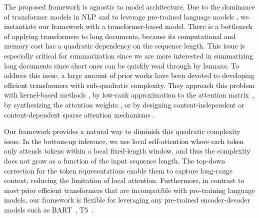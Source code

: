 \documentclass{article} \usepackage{iclr2022_conference,times}
\begin{document}
The proposed framework is agnostic to model architecture. Due to the dominance of transformer models in NLP \citep{chen-etal-2018-best, zhang2020pegasus, sun-etal-2019-utilizing, martin-etal-2020-camembert} and to leverage pre-trained language models \citep{Liu2019RoBERTaAR, lewis-etal-2020-bart}, we instantiate our framework with a transformer-based model. There is a bottleneck of applying transformers to long documents, because its computational and memory cost has a quadratic dependency on the sequence length. This issue is especially critical for summarization since we are more interested in summarizing long documents since short ones can be quickly read through by humans. To address this issue, a large amount of prior works have been devoted to developing efficient transformers with sub-quadratic complexity. They approach this problem with kernel-based methods \citep{katharopoulos_et_al_2020, choromanski2020rethinking}, by low-rank approximation to the attention matrix~\citep{wang2020linformer}, by synthesizing the attention weights \citep{tay2021synthesizer}, or by designing content-independent \citep{Child2019GeneratingLS, beltagy2020longformer, ainslie-etal-2020-etc, zaheer2020big} or content-dependent sparse attention mechanisms \citep{kitaev2020reformer, roy-etal-2021-efficient, wang-etal-2021-cluster}.  

Our framework provides a natural way to diminish this quadratic complexity issue. In the bottom-up inference, we use local self-attention where each token only attends tokens within a local fixed-length window, and thus the complexity does not grow as a function of the input sequence length. The top-down correction for the token representations enable them to capture long-range context, reducing the limitation of local attention. Furthermore, in contrast to most prior efficient transformers that are incompatible with pre-training language models, our framework is flexible for leveraging any pre-trained encoder-decoder models such as BART~\citep{lewis-etal-2020-bart}, T5~\citep{raffel2020exploring}. 
\end{document}
